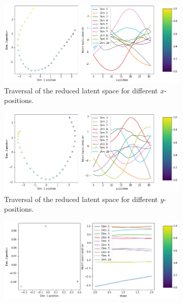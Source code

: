 \begin{figure}[H]
    \centering
    \begin{subfigure}{.48\textwidth}
        \includegraphics[width=\textwidth]{images/latent_space_traversals/vae_5000_dsprites_latent_space_values_x_position.png}
        \caption{Traversal of the reduced latent space for different $x$-positions.}
    \end{subfigure}
    \begin{subfigure}{.48\textwidth}
        \includegraphics[width=\textwidth]{images/latent_space_traversals/vae_5000_dsprites_latent_space_values_y_position.png}
        \caption{Traversal of the reduced latent space for different $y$-positions.}
    \end{subfigure}
    \begin{subfigure}{.48\textwidth}
        \includegraphics[width=\textwidth]{images/latent_space_traversals/vae_5000_dsprites_latent_space_values_shape.png}

\end{subfigure}
\end{figure}
